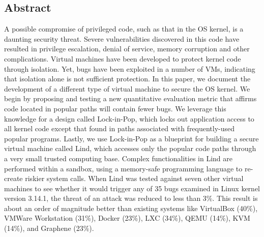 \subsection*{Abstract}
A possible compromise of privileged code, such as that in the OS kernel, is a
daunting security threat. Severe vulnerabilities discovered in this code
have resulted in privilege escalation, denial of service, memory corruption and
other complications. Virtual machines have been developed to protect kernel code
through isolation. Yet, bugs have been exploited in a number of VMs, indicating
that isolation alone is not sufficient protection. In this paper, we
document the development of a different type of virtual
machine to secure the OS kernel. We begin by proposing and testing a new
quantitative evaluation metric that affirms code located
in popular paths will contain fewer bugs. We leverage this knowledge
for a design called Lock-in-Pop, which locks out application access
to all kernel code except that found in paths associated with frequently-used
popular programs. Lastly, we use Lock-in-Pop as a blueprint for building a secure
virtual machine called Lind, which accesses only the popular code paths through
a very small trusted computing base. Complex functionalities in Lind are performed
within a sandbox, using a memory-safe programming language to re-create riskier system calls.
  When Lind was tested against seven other virtual machines to see whether it would
   trigger any of 35 bugs examined in Linux kernel version 3.14.1, the threat of
    an attack was reduced to less than 3\%. This result is about an order of
    magnitude better than existing systems like VirtualBox (40\%), VMWare Workstation
     (31\%), Docker (23\%), LXC (34\%), QEMU (14\%), KVM (14\%), and Graphene (23\%).

